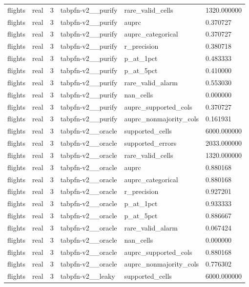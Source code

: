 \begin{tabular}{llllll}
flights & real & 3 & tabpfn-v2\_\_purify & rare\_valid\_cells & 1320.000000 \\
flights & real & 3 & tabpfn-v2\_\_purify & auprc & 0.370727 \\
flights & real & 3 & tabpfn-v2\_\_purify & auprc\_categorical & 0.370727 \\
flights & real & 3 & tabpfn-v2\_\_purify & r\_precision & 0.380718 \\
flights & real & 3 & tabpfn-v2\_\_purify & p\_at\_1pct & 0.483333 \\
flights & real & 3 & tabpfn-v2\_\_purify & p\_at\_5pct & 0.410000 \\
flights & real & 3 & tabpfn-v2\_\_purify & rare\_valid\_alarm & 0.553030 \\
flights & real & 3 & tabpfn-v2\_\_purify & nan\_cells & 0.000000 \\
flights & real & 3 & tabpfn-v2\_\_purify & auprc\_supported\_cols & 0.370727 \\
flights & real & 3 & tabpfn-v2\_\_purify & auprc\_nonmajority\_cols & 0.161931 \\
flights & real & 3 & tabpfn-v2\_\_oracle & supported\_cells & 6000.000000 \\
flights & real & 3 & tabpfn-v2\_\_oracle & supported\_errors & 2033.000000 \\
flights & real & 3 & tabpfn-v2\_\_oracle & rare\_valid\_cells & 1320.000000 \\
flights & real & 3 & tabpfn-v2\_\_oracle & auprc & 0.880168 \\
flights & real & 3 & tabpfn-v2\_\_oracle & auprc\_categorical & 0.880168 \\
flights & real & 3 & tabpfn-v2\_\_oracle & r\_precision & 0.927201 \\
flights & real & 3 & tabpfn-v2\_\_oracle & p\_at\_1pct & 0.933333 \\
flights & real & 3 & tabpfn-v2\_\_oracle & p\_at\_5pct & 0.886667 \\
flights & real & 3 & tabpfn-v2\_\_oracle & rare\_valid\_alarm & 0.067424 \\
flights & real & 3 & tabpfn-v2\_\_oracle & nan\_cells & 0.000000 \\
flights & real & 3 & tabpfn-v2\_\_oracle & auprc\_supported\_cols & 0.880168 \\
flights & real & 3 & tabpfn-v2\_\_oracle & auprc\_nonmajority\_cols & 0.776302 \\
flights & real & 3 & tabpfn-v2\_\_leaky & supported\_cells & 6000.000000 \\

\end{tabular}
